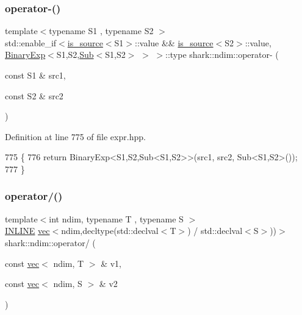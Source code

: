 \subsubsection{\texorpdfstring{operator-\/()}{operator-()}\hspace{0.1cm}{\footnotesize\ttfamily [8/8]}}
{\footnotesize\ttfamily template$<$typename S1 , typename S2 $>$ \\
std\+::enable\+\_\+if$<$\hyperlink{classshark_1_1ndim_1_1is__source}{is\+\_\+source}$<$S1$>$\+::value \&\& \hyperlink{classshark_1_1ndim_1_1is__source}{is\+\_\+source}$<$S2$>$\+::value, \hyperlink{classshark_1_1ndim_1_1_binary_exp}{Binary\+Exp}$<$S1,S2,\hyperlink{classshark_1_1ndim_1_1_sub}{Sub}$<$S1,S2$>$ $>$ $>$\+::type shark\+::ndim\+::operator-\/ (\begin{DoxyParamCaption}\item[{const S1 \&}]{src1,  }\item[{const S2 \&}]{src2 }\end{DoxyParamCaption})}



Definition at line 775 of file expr.\+hpp.


\begin{DoxyCode}
775                                                                                                            
                                              \{
776             \textcolor{keywordflow}{return} BinaryExp<S1,S2,Sub<S1,S2>>(src1, src2, Sub<S1,S2>());
777         \}
\end{DoxyCode}
\hypertarget{namespaceshark_1_1ndim_a6d5687e0b15f386881a84b1918185015}{}\label{namespaceshark_1_1ndim_a6d5687e0b15f386881a84b1918185015} 
\subsubsection{\texorpdfstring{operator/()}{operator/()}\hspace{0.1cm}{\footnotesize\ttfamily [1/5]}}
{\footnotesize\ttfamily template$<$int ndim, typename T , typename S $>$ \\
\hyperlink{common_8hpp_a2eb6f9e0395b47b8d5e3eeae4fe0c116}{I\+N\+L\+I\+NE} \hyperlink{structshark_1_1ndim_1_1vec}{vec}$<$ndim,decltype(std\+::declval$<$T$>$) / std\+::declval$<$S$>$))$>$ shark\+::ndim\+::operator/ (\begin{DoxyParamCaption}\item[{const \hyperlink{structshark_1_1ndim_1_1vec}{vec}$<$ ndim, T $>$ \&}]{v1,  }\item[{const \hyperlink{structshark_1_1ndim_1_1vec}{vec}$<$ ndim, S $>$ \&}]{v2 }\end{DoxyParamCaption})\hspace{0.3cm}{\ttfamily [inline]}}



